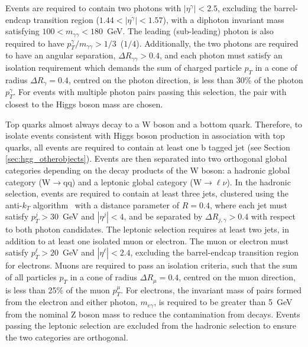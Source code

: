 Events are required to contain two photons with $|\eta^\gamma|<2.5$, excluding the barrel-endcap transition region ($1.44<|\eta^\gamma|<1.57$), with a diphoton invariant mass satisfying ${100<m_{\gamma\gamma}<180}$~GeV. The leading (sub-leading) photon is also required to have $p^\gamma_T/m_{\gamma\gamma}>1/3$~($1/4$). Additionally, the two photons are required to have an angular separation, $\Delta R_{\gamma\gamma}>0.4$, and each photon must satisfy an isolation requirement which demands the sum of charged particle $p_T$ in a cone of radius $\Delta R_{\gamma}=0.4$, centred on the photon direction, is less than 30\% of the photon $p_T^\gamma$. For events with multiple photon pairs passing this selection, the pair with \mgg closest to the Higgs boson mass are chosen.

Top quarks almost always decay to a W boson and a bottom quark. Therefore, to isolate events consistent with Higgs boson production in association with top quarks, all events are required to contain at least one b tagged jet (see Section \ref{sec:hgg_otherobjects}). Events are then separated into two orthogonal global categories depending on the decay products of the W boson: a hadronic global category (W$\rightarrow$qq) and a leptonic global category (W$\rightarrow\ell\nu$). In the hadronic selection, events are required to contain at least three jets, clustered using the anti-$k_T$ algorithm~\cite{Cacciari:2008gp,Cacciari:2011ma} with a distance parameter of $R=0.4$, where each jet must satisfy $p_T^j>30$~GeV and $|\eta^j|<4$, and be separated by $\Delta R_{j,\gamma}>0.4$ with respect to both photon candidates. The leptonic selection requires at least two jets, in addition to at least one isolated muon or electron. The muon or electron must satisfy $p_T^\ell>20$~GeV and $|\eta^\ell|<2.4$, excluding the barrel-endcap transition region for electrons. Muons are required to pass an isolation criteria, such that the sum of all particles $p_T$ in a cone of radius $\Delta R_{\mu}=0.4$, centred on the muon direction, is less than 25\% of the muon $p_T^\mu$. For electrons, the invariant mass of pairs formed from the electron and either photon, $m_{e\gamma}$, is required to be greater than 5~GeV from the nominal Z boson mass to reduce the contamination from \Zee decays. Events passing the leptonic selection are excluded from the hadronic selection to ensure the two categories are orthogonal.

